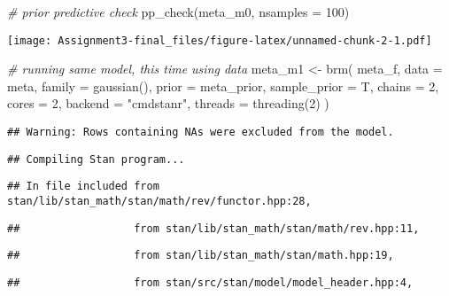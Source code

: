 \documentclass[
]{article}
\newenvironment{Shaded}{\begin{snugshade}}{\end{snugshade}}
\newcommand{\AttributeTok}[1]{\textcolor[rgb]{0.77,0.63,0.00}{#1}}
\newcommand{\CommentTok}[1]{\textcolor[rgb]{0.56,0.35,0.01}{\textit{#1}}}
\newcommand{\DecValTok}[1]{\textcolor[rgb]{0.00,0.00,0.81}{#1}}
\newcommand{\FunctionTok}[1]{\textcolor[rgb]{0.00,0.00,0.00}{#1}}
\newcommand{\NormalTok}[1]{#1}
\newcommand{\OtherTok}[1]{\textcolor[rgb]{0.56,0.35,0.01}{#1}}
\newcommand{\StringTok}[1]{\textcolor[rgb]{0.31,0.60,0.02}{#1}}
\begin{document}
\begin{Shaded}
\begin{Highlighting}[]
\CommentTok{\# prior predictive check}
\FunctionTok{pp\_check}\NormalTok{(meta\_m0, }\AttributeTok{nsamples =} \DecValTok{100}\NormalTok{)}
\end{Highlighting}
\end{Shaded}

\texttt{[image: Assignment3-final\_files/figure-latex/unnamed-chunk-2-1.pdf]}

\begin{Shaded}
\begin{Highlighting}[]
\CommentTok{\# running same model, this time using data}
\NormalTok{meta\_m1 }\OtherTok{\textless{}{-}} \FunctionTok{brm}\NormalTok{(}
\NormalTok{  meta\_f,}
  \AttributeTok{data =}\NormalTok{ meta,}
  \AttributeTok{family =} \FunctionTok{gaussian}\NormalTok{(),}
  \AttributeTok{prior =}\NormalTok{ meta\_prior,}
  \AttributeTok{sample\_prior =}\NormalTok{ T,}
  \AttributeTok{chains =} \DecValTok{2}\NormalTok{,}
  \AttributeTok{cores =} \DecValTok{2}\NormalTok{, }
  \AttributeTok{backend =} \StringTok{"cmdstanr"}\NormalTok{,}
  \AttributeTok{threads =} \FunctionTok{threading}\NormalTok{(}\DecValTok{2}\NormalTok{)}
\NormalTok{)}
\end{Highlighting}
\end{Shaded}

\begin{verbatim}
## Warning: Rows containing NAs were excluded from the model.
\end{verbatim}

\begin{verbatim}
## Compiling Stan program...
\end{verbatim}

\begin{verbatim}
## In file included from stan/lib/stan_math/stan/math/rev/functor.hpp:28,
\end{verbatim}

\begin{verbatim}
##                  from stan/lib/stan_math/stan/math/rev.hpp:11,
\end{verbatim}

\begin{verbatim}
##                  from stan/lib/stan_math/stan/math.hpp:19,
\end{verbatim}

\begin{verbatim}
##                  from stan/src/stan/model/model_header.hpp:4,
\end{verbatim}
\end{document}

